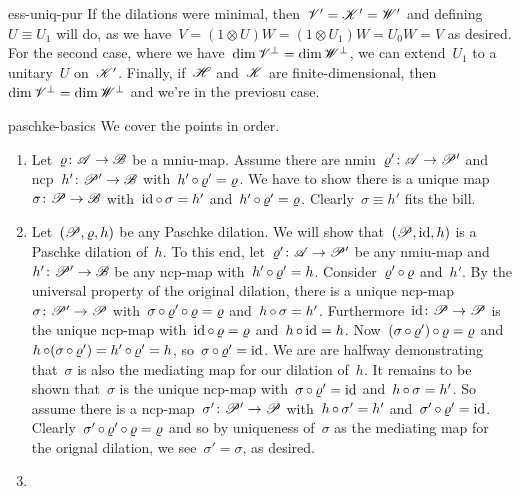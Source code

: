 \begin{solution}{ess-uniq-pur}
If the dilations were minimal, then~$\mathscr{V}'=\mathscr{K}'=\mathscr{W}'$
    and defining~$U \equiv U_1$ will do,
    as we have~$V = (1\otimes U) W
    =   (1 \otimes U_1) W
     = U_0 W = V$ as desired.
For the second case, where we have~$\dim\mathscr{V}^\perp = \dim \mathscr{W}^\perp$,
    we can extend~$U_1$ to a unitary~$U$ on~$\mathscr{K}'$.
Finally, if~$\mathscr{H}$ and~$\mathscr{K}$ are finite-dimensional,
    then~$\dim\mathscr{V}^\perp = \dim \mathscr{W}^\perp$
    and we're in the previosu case.
\end{solution}
\begin{solution}{paschke-basics}%
We cover the points in order.
\begin{enumerate}
\item
Let~$\varrho \colon \mathscr{A} \to \mathscr{B}$ be a mniu-map.
Assume there are nmiu~$\varrho'\colon \mathscr{A} \to \mathscr{P}'$
    and ncp~$h'\colon \mathscr{P}' \to \mathscr{B}$
        with~$h' \mathop{\circ} \varrho' = \varrho$.
We have to show there is a unique map~$\sigma\colon \mathscr{P} \to \mathscr{B}$
    with~$\mathrm{id} \mathop{\circ} \sigma= h'$ and~$h' \mathop{\circ} \varrho' = \varrho$.
        Clearly~$\sigma\equiv h' $ fits the bill.

\item
Let~$(\mathscr{P},\varrho,h)$ be any Paschke dilation.
        We will show that~$(\mathscr{P}, \mathrm{id}, h)$ is a Paschke dilation of~$h$.
To this end, let~$\varrho'\colon \mathscr{A} \to \mathscr{P}'$
        be any nmiu-map and~$h'\colon \mathscr{P}' \to \mathscr{B}$
        be any ncp-map with~$h' \mathop{\circ} \varrho' = h$.
Consider~$\varrho' \mathop{\circ} \varrho$ and~$h'$.
    By the universal property of the original dilation,
            there is a unique ncp-map~$\sigma \colon \mathscr{P}' \to \mathscr{P}$
                with~$\sigma\mathop{\circ}\varrho'\mathop{\circ}\varrho = \varrho$
                and~$h \mathop{\circ}\sigma = h'$.
Furthermore~$\mathrm{id}\colon \mathscr{P} \to \mathscr{P}$
    is the unique ncp-map
        with~$\mathrm{id} \mathop{\circ} \varrho = \varrho$
        and~$h \mathop{\circ} \mathrm{id} = h$.
Now~$(\sigma \mathop{\circ} \varrho') \mathop{\circ} \varrho = \varrho$
    and~$h \mathop{\circ} (\sigma \mathop{\circ} \varrho') = h' \mathop{\circ} \varrho' = h$,
        so~$\sigma \mathop{\circ} \varrho' = \mathrm{id}$.
We are are halfway demonstrating that~$\sigma$ is also the mediating map
        for our dilation of~$h$.
It remains to be shown that~$\sigma$ is the unique ncp-map
    with~$\sigma \mathop{\circ} \varrho' = \mathrm{id}$
        and~$h \mathop{\circ} \sigma = h'$.
So assume there is a ncp-map~$\sigma'\colon \mathscr{P}' \to \mathscr{P}$
    with~$h \mathop{\circ} \sigma' = h'$ and~$\sigma' \mathop{\circ} \varrho' = \mathrm{id}$.
    Clearly~$\sigma' \mathop{\circ}\varrho' \mathop{\circ}\varrho =\varrho$
        and so by uniqueness of~$\sigma$ as the mediating map
        for the orignal dilation,
        we see~$\sigma' = \sigma$, as desired.
    \item


\end{enumerate}
\end{solution}
